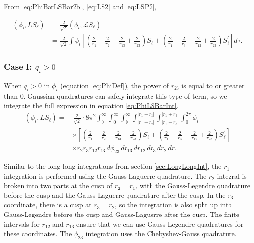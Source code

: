 \documentclass[Dissertation.tex]{subfiles}
\begin{document}
From \ref{eq:PhiBarLSBar2b}, \ref{eq:LS2} and \ref{eq:LSP2}, 

\begin{align}
\label{eq:PhiLSBarInt}
\nonumber (\bar{\phi}_i, L\bar{S}_\ell) &= \frac{2}{\sqrt{2}} \left(\phi_i,\mathcal{L} \bar{S}_\ell\right) \\
 &= \frac{2}{\sqrt{2}} \int \phi_i \left[ \left( \frac{2}{r_1} - \frac{2}{r_2} - \frac{2}{r_{13}} + \frac{2}{r_{23}} \right)S_\ell \pm \left( \frac{2}{r_1} - \frac{2}{r_3} - \frac{2}{r_{12}} + \frac{2}{r_{23}} \right) S_\ell^\prime \right]  d\tau.
\end{align}

\subsubsection{Case I: \texorpdfstring{$q_i > 0$}{qi > 0}}
\label{sec:Swaveqigt0}
When $q_i > 0$ in $\phi_i$ (equation \ref{eq:PhiDef}), the power of $r_{23}$ is equal to or greater than 0.  Gaussian quadratures can safely integrate this type of term, so we integrate the full expression in equation \ref{eq:PhiLSBarInt}.
\begin{align}
\label{eq:PhiLSBarIntFull}
\nonumber (\bar{\phi}_i, L\bar{S}_\ell) =& \, \frac{2}{\sqrt{2}} \cdot 8\pi^2  \int_0^\infty \int_0^\infty \int_0^\infty \int_{|r_1 - r_2|}^{|r_1 + r_2|} \int_{|r_1 - r_3|}^{|r_1 + r_3|} \int_0^{2\pi} \phi_i \\
&\times \left[ \left( \frac{2}{r_1} - \frac{2}{r_2} - \frac{2}{r_{13}} + \frac{2}{r_{23}} \right)S_\ell \pm \left( \frac{2}{r_1} - \frac{2}{r_3} - \frac{2}{r_{12}} + \frac{2}{r_{23}} \right) S_\ell^\prime \right] \\
&\times r_2 r_3 r_{12} r_{13}\, d\phi_{23}\, dr_{13}\, dr_{12}\, dr_3\, dr_2\, dr_1
\end{align}

Similar to the long-long integrations from section \ref{sec:LongLongInt}, the $r_1$ integration is performed using the Gauss-Laguerre quadrature.  The $r_2$ integral is broken into two parts at the cusp of $r_2 = r_1$, with the Gauss-Legendre quadrature before the cusp and the Gauss-Laguerre quadrature after the cusp.  In the $r_3$ coordinate, there is a cusp at $r_3 = r_2$, so the integration is also split up into Gauss-Legendre before the cusp and Gauss-Laguerre after the cusp.  The finite intervals for $r_{12}$ and $r_{13}$ ensure that we can use Gauss-Legendre quadratures for these coordinates.  The $\phi_{23}$ integration uses the Chebyshev-Gauss quadrature.
\end{document}
